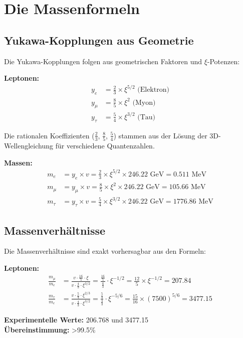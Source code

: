 \documentclass[12pt,a4paper]{article}
\newcommand{\xipar}{\xi}
\begin{document}
	\section{Die Massenformeln}
	
	\subsection{Yukawa-Kopplungen aus Geometrie}
	
	\begin{secondary}
		Die Yukawa-Kopplungen folgen aus geometrischen Faktoren und $\xipar$-Potenzen:
		
		\textbf{Leptonen:}
		\begin{align}
			y_e &= \frac{2}{3} \times \xipar^{5/2} \text{ (Elektron)} \\
			y_\mu &= \frac{8}{5} \times \xipar^{2} \text{ (Myon)} \\
			y_\tau &= \frac{5}{4} \times \xipar^{3/2} \text{ (Tau)}
		\end{align}
		
		Die rationalen Koeffizienten ($\frac{2}{3}$, $\frac{8}{5}$, $\frac{5}{4}$) stammen aus der Lösung der 3D-Wellengleichung für verschiedene Quantenzahlen.
		
		\textbf{Massen:}
		\begin{align}
			m_e &= y_e \times v = \frac{2}{3} \times \xipar^{5/2} \times 246.22 \text{ GeV} = 0.511 \text{ MeV} \\
			m_\mu &= y_\mu \times v = \frac{8}{5} \times \xipar^{2} \times 246.22 \text{ GeV} = 105.66 \text{ MeV} \\
			m_\tau &= y_\tau \times v = \frac{5}{4} \times \xipar^{3/2} \times 246.22 \text{ GeV} = 1776.86 \text{ MeV}
		\end{align}
	\end{secondary}
	
	\subsection{Massenverhältnisse}
	
	\begin{result}
		Die Massenverhältnisse sind exakt vorhersagbar aus den Formeln:
		
		\textbf{Leptonen:}
		\begin{align}
			\frac{m_\mu}{m_e} &= \frac{v \cdot \frac{16}{5} \cdot \xipar}{v \cdot \frac{4}{3} \cdot \xipar^{3/2}} = \frac{\frac{16}{5}}{\frac{4}{3}} \cdot \xipar^{-1/2} = \frac{12}{5} \times \xipar^{-1/2} = 207.84 \\
			\frac{m_\tau}{m_e} &= \frac{v \cdot \frac{5}{4} \cdot \xipar^{2/3}}{v \cdot \frac{4}{3} \cdot \xipar^{3/2}} = \frac{\frac{5}{4}}{\frac{4}{3}} \cdot \xipar^{-5/6} = \frac{15}{16} \times (7500)^{5/6} = 3477.15
		\end{align}
		
		\textbf{Experimentelle Werte:} 206.768 und 3477.15 \\
		\textbf{Übereinstimmung:} >99.5\%
	\end{result}
	
\end{document}
